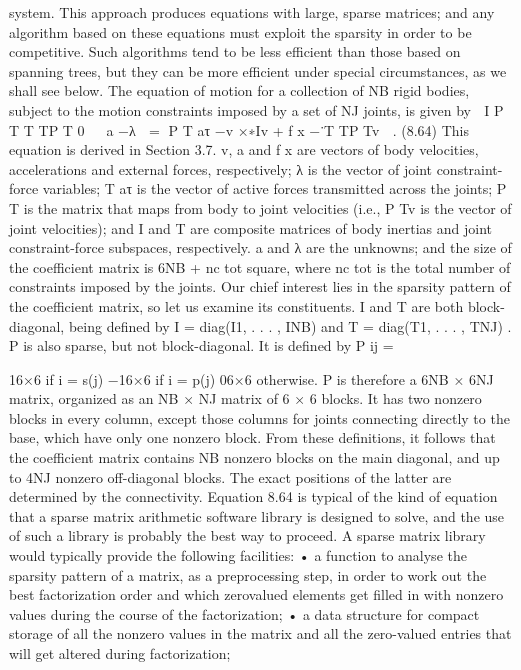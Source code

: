 system. This approach produces equations with large, sparse matrices; and any algorithm based on these equations must exploit the sparsity in order to be competitive. Such algorithms tend to be less efficient than those based on spanning trees, but they can be more efficient under special circumstances, as we shall see below. The equation of motion for a collection of NB rigid bodies, subject to the motion constraints imposed by a set of NJ joints, is given by  I P T T TP T 0   a −λ  = P T aτ −v ×∗Iv + f x −˙T TP Tv  . (8.64) This equation is derived in Section 3.7. v, a and f x are vectors of body velocities, accelerations and external forces, respectively; λ is the vector of joint constraint-force variables; T aτ is the vector of active forces transmitted across the joints; P T is the matrix that maps from body to joint velocities (i.e., P Tv is the vector of joint velocities); and I and T are composite matrices of body inertias and joint constraint-force subspaces, respectively. a and λ are the unknowns; and the size of the coefficient matrix is 6NB + nc tot square, where nc tot is the total number of constraints imposed by the joints. Our chief interest lies in the sparsity pattern of the coefficient matrix, so let us examine its constituents. I and T are both block-diagonal, being defined by I = diag(I1, . . . , INB) and T = diag(T1, . . . , TNJ) . P is also sparse, but not block-diagonal. It is defined by P ij =

16×6 if i = s(j) −16×6 if i = p(j) 06×6 otherwise. P is therefore a 6NB × 6NJ matrix, organized as an NB × NJ matrix of 6 × 6 blocks. It has two nonzero blocks in every column, except those columns for joints connecting directly to the base, which have only one nonzero block. From these definitions, it follows that the coefficient matrix contains NB nonzero blocks on the main diagonal, and up to 4NJ nonzero off-diagonal blocks. The exact positions of the latter are determined by the connectivity. Equation 8.64 is typical of the kind of equation that a sparse matrix arithmetic software library is designed to solve, and the use of such a library is probably the best way to proceed. A sparse matrix library would typically provide the following facilities: • a function to analyse the sparsity pattern of a matrix, as a preprocessing step, in order to work out the best factorization order and which zerovalued elements get filled in with nonzero values during the course of the factorization; • a data structure for compact storage of all the nonzero values in the matrix and all the zero-valued entries that will get altered during factorization;

